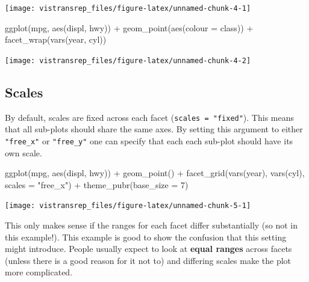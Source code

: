 \documentclass[]{book}
\newenvironment{Shaded}{}{}
\newcommand{\DataTypeTok}[1]{#1}
\newcommand{\DecValTok}[1]{#1}
\newcommand{\KeywordTok}[1]{\textcolor[rgb]{0.00,0.00,1.00}{#1}}
\newcommand{\NormalTok}[1]{#1}
\newcommand{\OperatorTok}[1]{#1}
\newcommand{\StringTok}[1]{\textcolor[rgb]{0.00,0.50,0.50}{#1}}
\begin{document}
\begin{flushright}\texttt{[image: vistransrep\_files/figure-latex/unnamed-chunk-4-1]} \end{flushright}

\begin{Shaded}
\begin{Highlighting}[]
\KeywordTok{ggplot}\NormalTok{(mpg, }\KeywordTok{aes}\NormalTok{(displ, hwy)) }\OperatorTok{+}
\StringTok{  }\KeywordTok{geom_point}\NormalTok{(}\KeywordTok{aes}\NormalTok{(}\DataTypeTok{colour =}\NormalTok{ class)) }\OperatorTok{+}
\StringTok{  }\KeywordTok{facet_wrap}\NormalTok{(}\KeywordTok{vars}\NormalTok{(year, cyl))}
\end{Highlighting}
\end{Shaded}

\begin{flushright}\texttt{[image: vistransrep\_files/figure-latex/unnamed-chunk-4-2]} \end{flushright}

\hypertarget{scales-1}{%
\subsection{Scales}\label{scales-1}}

By default, scales are fixed across each facet (\texttt{scales\ =\ "fixed"}).
This means that all sub-plots should share the same axes.
By setting this argument to either \texttt{"free\_x"} or \texttt{"free\_y"} one can specify that each each sub-plot should have its own scale.

\begin{Shaded}
\begin{Highlighting}[]
\KeywordTok{ggplot}\NormalTok{(mpg, }\KeywordTok{aes}\NormalTok{(displ, hwy)) }\OperatorTok{+}
\StringTok{  }\KeywordTok{geom_point}\NormalTok{() }\OperatorTok{+}
\StringTok{  }\KeywordTok{facet_grid}\NormalTok{(}\KeywordTok{vars}\NormalTok{(year), }\KeywordTok{vars}\NormalTok{(cyl), }\DataTypeTok{scales =} \StringTok{"free_x"}\NormalTok{) }\OperatorTok{+}
\StringTok{  }\KeywordTok{theme_pubr}\NormalTok{(}\DataTypeTok{base_size =} \DecValTok{7}\NormalTok{)}
\end{Highlighting}
\end{Shaded}

\begin{flushright}\texttt{[image: vistransrep\_files/figure-latex/unnamed-chunk-5-1]} \end{flushright}

This only makes sense if the ranges for each facet differ substantially (so not in this example!).
This example is good to show the confusion that this setting might introduce.
People usually expect to look at \textbf{equal ranges} across facets (unless there is a good reason for it not to) and differing scales make the plot more complicated.
\end{document}
